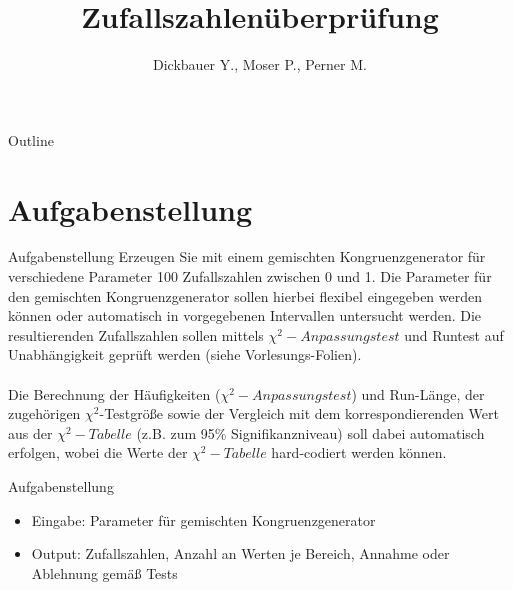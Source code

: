 

\title[BSP24 - Zufallszahlenüberprüfung]{Zufallszahlenüberprüfung}
\author{Dickbauer Y., Moser P., Perner M.}



\begin{frame}
  \titlepage
\end{frame}

\begin{frame}{Outline}
  \tableofcontents
\end{frame}

\section{Aufgabenstellung}
\begin{frame}{Aufgabenstellung}
Erzeugen Sie mit einem gemischten Kongruenzgenerator für verschiedene Parameter 100 Zufallszahlen zwischen 0 und 1. Die Parameter für den gemischten Kongruenzgenerator sollen hierbei flexibel eingegeben werden können oder automatisch in vorgegebenen Intervallen untersucht werden. Die resultierenden Zufallszahlen sollen mittels $\chi^2-Anpassungstest$ und Runtest auf Unabhängigkeit geprüft werden (siehe Vorlesungs-Folien). \\~\\
Die Berechnung der Häufigkeiten ($\chi^2-Anpassungstest$) und Run-Länge, der zugehörigen $\chi^2$-Testgröße sowie der Vergleich mit dem korrespondierenden Wert aus der $\chi^2-Tabelle$ (z.B. zum 95\% Signifikanzniveau) soll dabei automatisch erfolgen, wobei die Werte der $\chi^2-Tabelle$ hard-codiert werden können.
\end{frame}

\begin{frame}{Aufgabenstellung}

\begin{itemize}
  \item Eingabe: Parameter für gemischten Kongruenzgenerator
  \vspace{1cm}
  \item Output: Zufallszahlen, Anzahl an Werten je Bereich, Annahme oder Ablehnung gemäß Tests
\end{itemize}
\end{frame}

